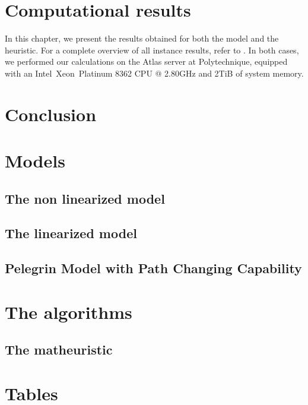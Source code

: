 \documentclass[a4paper,12pt]{report}
\begin{document}
\chapter{Computational results}\label{chap:results}
In this chapter, we present the results obtained for both the model and the heuristic.  
For a complete overview of all instance results, refer to \cite{Magi_Methods_for_Traffic_2025}.  
In both cases, we performed our calculations on the Atlas server at Polytechnique, equipped with an Intel\textregistered~Xeon\textregistered~Platinum 8362 CPU @ 2.80GHz and 2TiB of system memory.


\chapter{Conclusion}\label{chap:conclusion}

%

\printbibliography

\appendix 
\chapter{Models} 
\section{The non linearized model}\label{sec:wholeModel}
 
\section{The linearized model}\label{sec:linearModel}

\section{Pelegrin Model with Path Changing Capability}\label{sec:MercedesModifedModel}

\chapter{The algorithms}
\section{The matheuristic}\label{alg:matheuristic}

\chapter{Tables}
\end{document}
